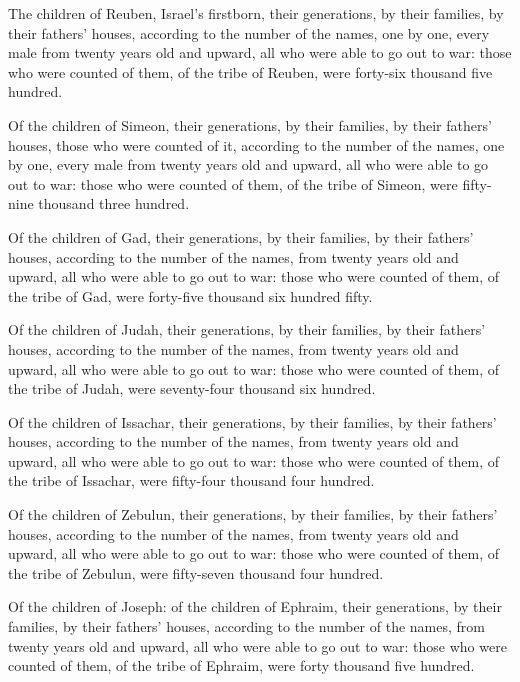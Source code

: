  The children of Reuben, Israel's firstborn, their
generations, by their families, by their fathers' houses, according to
the number of the names, one by one, every male from twenty years old
and upward, all who were able to go out to war:  those
who were counted of them, of the tribe of Reuben, were forty-six
thousand five hundred.

 Of the children of Simeon, their generations, by their
families, by their fathers' houses, those who were counted of it,
according to the number of the names, one by one, every male from twenty
years old and upward, all who were able to go out to war:
 those who were counted of them, of the tribe of Simeon,
were fifty-nine thousand three hundred.

 Of the children of Gad, their generations, by their
families, by their fathers' houses, according to the number of the
names, from twenty years old and upward, all who were able to go out to
war:  those who were counted of them, of the tribe of
Gad, were forty-five thousand six hundred fifty.

 Of the children of Judah, their generations, by their
families, by their fathers' houses, according to the number of the
names, from twenty years old and upward, all who were able to go out to
war:  those who were counted of them, of the tribe of
Judah, were seventy-four thousand six hundred.

 Of the children of Issachar, their generations, by their
families, by their fathers' houses, according to the number of the
names, from twenty years old and upward, all who were able to go out to
war:  those who were counted of them, of the tribe of
Issachar, were fifty-four thousand four hundred.

 Of the children of Zebulun, their generations, by their
families, by their fathers' houses, according to the number of the
names, from twenty years old and upward, all who were able to go out to
war:  those who were counted of them, of the tribe of
Zebulun, were fifty-seven thousand four hundred.

 Of the children of Joseph: of the children of Ephraim,
their generations, by their families, by their fathers' houses,
according to the number of the names, from twenty years old and upward,
all who were able to go out to war:  those who were
counted of them, of the tribe of Ephraim, were forty thousand five
hundred.


